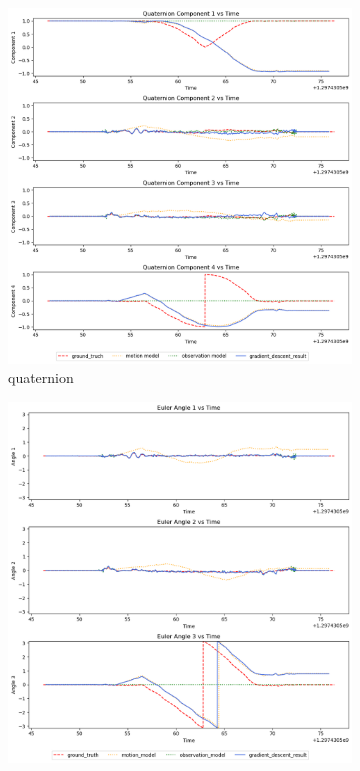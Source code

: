 \documentclass[conference]{IEEEtran}
\begin{document}
\begin{figure}[h]
    \centering
    \begin{subfigure}{0.4\textwidth}
        \includegraphics[width=\linewidth]{../img/9_qt.png}
        \caption{quaternion}
        \label{fig:9qt}
    \end{subfigure}
    \hfill
    \begin{subfigure}{0.4\textwidth}
        \includegraphics[width=\linewidth]{../img/9_ea.png}

\end{subfigure}
\end{figure}
\end{document}
